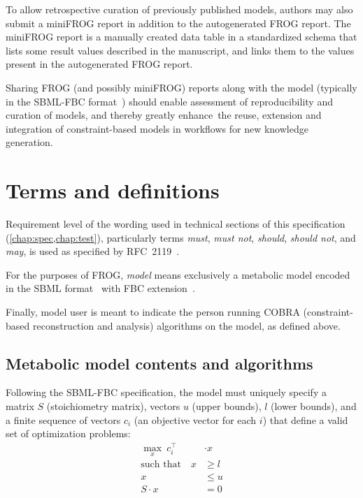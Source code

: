 To allow retrospective curation of previously published models, authors may also submit a miniFROG report in addition to the autogenerated FROG report. The miniFROG report is a manually created data table in a standardized schema that lists some result values described in the manuscript, and links them to the values present in the autogenerated FROG report.

Sharing FROG (and possibly miniFROG) reports along with the model (typically in the SBML-FBC format~\cite{olivier2018sbmlfbc}) should enable assessment of reproducibility and curation of models, and thereby greatly enhance the reuse, extension and integration of constraint-based models in workflows for new knowledge generation. 

\section{Terms and definitions}

Requirement level of the wording used in technical sections of this specification (\cref{chap:spec,chap:test}), particularly terms \emph{must}, \emph{must not}, \emph{should}, \emph{should not}, and \emph{may}, is used as specified by RFC~2119~\cite{rfc2119}.

For the purposes of FROG, \emph{model} means exclusively a metabolic model encoded in the SBML format~\cite{hucka2003systems,keating2020sbml} with FBC extension~\cite{olivier2018sbmlfbc}.

Finally, model user is meant to indicate the person running COBRA
(constraint-based reconstruction and analysis) algorithms on the model, as
defined above. 

\subsection{Metabolic model contents and algorithms}
\label{sec:algos}

Following the SBML-FBC specification, the model must uniquely specify a matrix $S$ (stoichiometry matrix), vectors $u$ (upper bounds), $l$ (lower bounds), and a finite sequence of vectors $c_i$ (an objective vector for each $i$) that define a valid set of optimization problems:
\begin{align*}
\max_x\ c_i^\intercal &\cdot x \\
\text{such that}\quad
x & \geq l \\
x & \leq u \\
S\cdot x &= 0
\end{align*}

